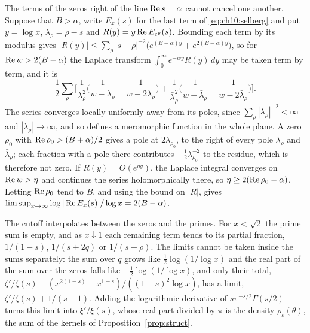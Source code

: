 The terms of the zeros right of the line $\operatorname{Re} s=\alpha$ cannot cancel one another. Suppose that $B>\alpha$, write $E_x(s)$ for the last term of \eqref{eq:ch10:selberg} and put $y=\log x$, $\lambda_\rho=\rho-s$ and $R(y)=y\operatorname{Re} E_{e^y}(s)$. Bounding each term by its modulus gives $|R(y)|\le\sum_\rho|s-\rho|^{-2}\big(e^{(B-\alpha)y}+e^{2(B-\alpha)y}\big)$, so for $\operatorname{Re} w>2(B-\alpha)$ the Laplace transform $\int_0^\infty e^{-wy}R(y)\,dy$ may be taken term by term, and it is
\[
\frac12\sum_\rho\Big[\frac1{\lambda_\rho^2}\Big(\frac1{w-\lambda_\rho}-\frac1{w-2\lambda_\rho}\Big)+\frac1{\bar\lambda_\rho^2}\Big(\frac1{w-\bar\lambda_\rho}-\frac1{w-2\bar\lambda_\rho}\Big)\Big].
\]
The series converges locally uniformly away from its poles, since $\sum_\rho|\lambda_\rho|^{-2}<\infty$ and $|\lambda_\rho|\to\infty$, and so defines a meromorphic function in the whole plane. A zero $\rho_0$ with $\operatorname{Re}\rho_0>(B+\alpha)/2$ gives a pole at $2\lambda_{\rho_0}$, to the right of every pole $\lambda_\rho$ and $\bar\lambda_\rho$; each fraction with a pole there contributes $-\frac12\lambda_{\rho_0}^{-2}$ to the residue, which is therefore not zero. If $R(y)=O(e^{\eta y})$, the Laplace integral converges on $\operatorname{Re} w>\eta$ and continues the series holomorphically there, so $\eta\ge2(\operatorname{Re}\rho_0-\alpha)$. Letting $\operatorname{Re}\rho_0$ tend to $B$, and using the bound on $|R|$, gives $\limsup_{x\to\infty}\log|\operatorname{Re} E_x(s)|/\log x=2(B-\alpha)$.

The cutoff interpolates between the zeros and the primes. For $x<\sqrt2$ the prime sum is empty, and as $x\downarrow1$ each remaining term tends to its partial fraction, $1/(1-s)$, $1/(s+2q)$ or $1/(s-\rho)$. The limits cannot be taken inside the sums separately: the sum over $q$ grows like $\frac12\log(1/\log x)$ and the real part of the sum over the zeros falls like $-\frac12\log(1/\log x)$, and only their total, $\zeta'/\zeta(s)-(x^{2(1-s)}-x^{1-s})/((1-s)^2\log x)$, has a limit, $\zeta'/\zeta(s)+1/(s-1)$. Adding the logarithmic derivative of $s\pi^{-s/2}\Gamma(s/2)$ turns this limit into $\xi'/\xi(s)$, whose real part divided by $\pi$ is the density $\rho_\varepsilon(\theta)$, the sum of the kernels of Proposition~\ref{prop:struct}.

